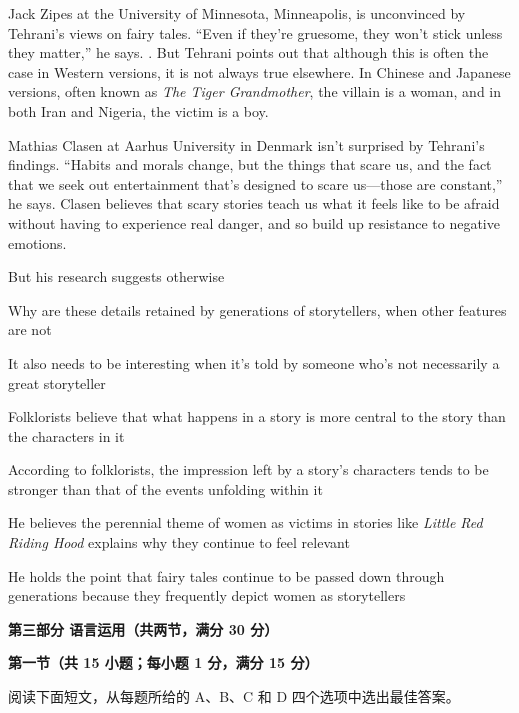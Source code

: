 \documentclass{exam-zh}
\begin{document}
Jack Zipes at the University of Minnesota, Minneapolis, is unconvinced by Tehrani's views on fairy tales. ``Even if they're gruesome, they won't stick unless they matter,'' he says. \fillin[F]. But Tehrani points out that although this is often the case in Western versions, it is not always true elsewhere. In Chinese and Japanese versions, often known as \textit{The Tiger Grandmother}, the villain is a woman, and in both Iran and Nigeria, the victim is a boy.

Mathias Clasen at Aarhus University in Denmark isn't surprised by Tehrani's findings. ``Habits and morals change, but the things that scare us, and the fact that we seek out entertainment that's designed to scare us—those are constant,'' he says. Clasen believes that scary stories teach us what it feels like to be afraid without having to experience real danger, and so build up resistance to negative emotions.

\begin{choices}
\item But his research suggests otherwise
\item Why are these details retained by generations of storytellers, when other features are not
\item It also needs to be interesting when it's told by someone who's not necessarily a great storyteller
\item Folklorists believe that what happens in a story is more central to the story than the characters in it
\item According to folklorists, the impression left by a story's characters tends to be stronger than that of the events unfolding within it
\item He believes the perennial theme of women as victims in stories like \textit{Little Red Riding Hood} explains why they continue to feel relevant
\item He holds the point that fairy tales continue to be passed down through generations because they frequently depict women as storytellers
\end{choices}

\begin{flushleft}
  {\bfseries 第三部分 \hspace{0.5em} 语言运用（共两节，满分 30 分）}

  {\bfseries 第一节（共 15 小题；每小题 1 分，满分 15 分）}
\end{flushleft}

阅读下面短文，从每题所给的 A、B、C 和 D 四个选项中选出最佳答案。
\end{document}
